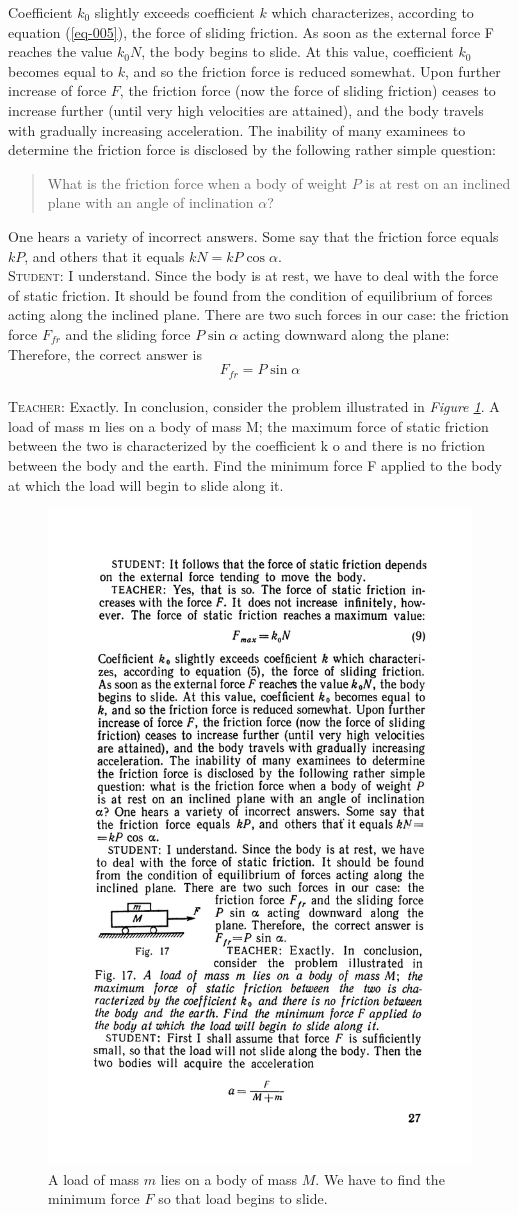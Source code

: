 \documentclass[a4paper,sfsidenotes]{tufte-book}
\begin{document}
Coefficient $k_{0}$ slightly exceeds coefficient $k$ which characterizes, according to equation (\ref{eq-005}), the force of sliding friction. As soon as the external force F reaches the value $k_{0}N$, the body begins to slide. At this value, coefficient $k_{0}$ becomes equal to $k$, and so the friction force is reduced somewhat. Upon further increase of force $F$, the friction force (now the force of sliding friction) ceases to increase further (until very high velocities are attained), and the body travels with gradually increasing acceleration. The inability of many examinees to determine the friction force is disclosed by the following rather simple question:
 \begin{quote}
 What is the friction force when a body of weight $P$ is at rest on an inclined plane with an angle of inclination $\alpha$?
 \end{quote}
  One hears a variety of incorrect answers. Some say that the friction force equals $kP$, and others that it equals $kN =kP \cos \alpha$.
\\
\textsc{Student:} I understand. Since the body is at rest, we have to deal with the force of static friction. It should be found from the condition of equilibrium of forces acting along the inclined plane. There are two such forces in our case: the friction force $F_{fr}$ and the sliding force $P \sin \alpha$ acting downward along the plane: Therefore, the correct answer is
$$
F_{fr}=P \sin \alpha
$$
\\
\textsc{Teacher:} Exactly. In conclusion, consider the problem illustrated in \emph{Figure \ref{fig-17}}. A load of mass m lies on a body of mass M; the maximum force of static friction between the two is characterized by the coefficient k o and there is no friction between the body and the earth. Find the minimum force F applied to the body at which the load will begin to slide along it.\\
\begin{figure}
\centering
\includegraphics[width=0.55\linewidth]{fig-017a.pdf}
\caption{A load of mass $m$ lies on a body of mass $M$. We have to find the minimum force $F$ so that load begins to slide. }
\label{fig-17}
\end{figure}
\end{document}
